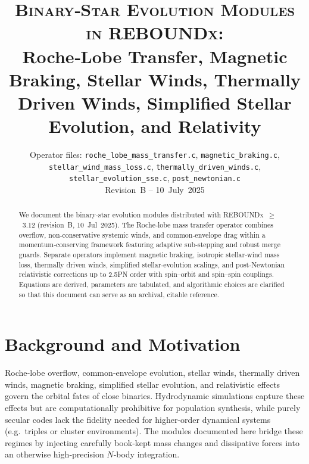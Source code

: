 \documentclass[11pt]{article}
\begin{document}
\title{\textsc{Binary‑Star Evolution Modules in
         \textnormal{REBOUNDx}}:\\
       Roche‑Lobe Transfer, Magnetic Braking, Stellar Winds, Thermally Driven Winds, Simplified
       Stellar Evolution, and Relativity}
\author{Operator files: \texttt{roche\_lobe\_mass\_transfer.c},
        \texttt{magnetic\_braking.c},
        \texttt{stellar\_wind\_mass\_loss.c},
        \texttt{thermally\_driven\_winds.c},
        \texttt{stellar\_evolution\_sse.c},
        \texttt{post\_newtonian.c}\\
        Revision B – 10 July 2025}
\date{}
\maketitle
\vspace*{-1.5em}

\begin{abstract}
We document the binary‑star evolution modules distributed with
\textsc{REBOUNDx} $\ge$ 3.12 (revision B, 10 Jul 2025).
The Roche‑lobe mass transfer operator combines overflow, non‑conservative
systemic winds, and common‑envelope drag within a momentum‑conserving
framework featuring adaptive sub‑stepping and robust merge guards.
Separate operators implement magnetic braking, isotropic stellar‑wind
mass loss, thermally driven winds, simplified stellar‑evolution scalings,
and post‑Newtonian relativistic corrections up to 2.5PN order with spin--orbit and spin--spin couplings.  Equations are derived,
parameters are tabulated, and algorithmic
choices are clarified so that this document can serve as an archival,
citable reference.
\end{abstract}

\section{Background and Motivation}
\label{sec:intro}
Roche‑lobe overflow, common‑envelope evolution, stellar winds,
thermally driven winds, magnetic braking, simplified stellar evolution, and relativistic effects
govern the orbital fates of close binaries\citep{Eggleton1983,Ostriker1999,
Peters1964,Reimers1975,Verbunt1981,Kawaler1988,Hurley2000}.  Hydrodynamic
simulations capture these effects but are computationally prohibitive for
population synthesis, while purely secular codes lack the fidelity needed
for higher‑order dynamical systems (e.g.\ triples or cluster environments).
The modules documented here bridge these regimes by injecting carefully
book‑kept mass changes and dissipative forces into an otherwise
high‑precision $N$‑body integration.
\end{document}
